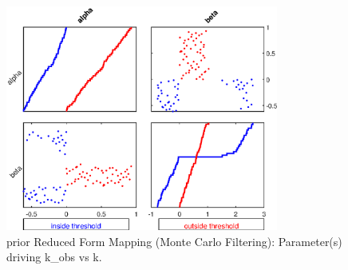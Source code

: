 
\begin{figure}[H]
\centering 
\includegraphics[width=0.8\textwidth]{RBC_kz/gsa/redform_prior/k_obs_vs_k_threshold/RBC_kz_prior_k_obs_vs_k_threshold}
\caption{prior Reduced Form Mapping (Monte Carlo Filtering): Parameter(s) driving k\_obs vs k.}\label{Fig:RBC_kz_prior_k_obs_vs_k_threshold}
\end{figure}


